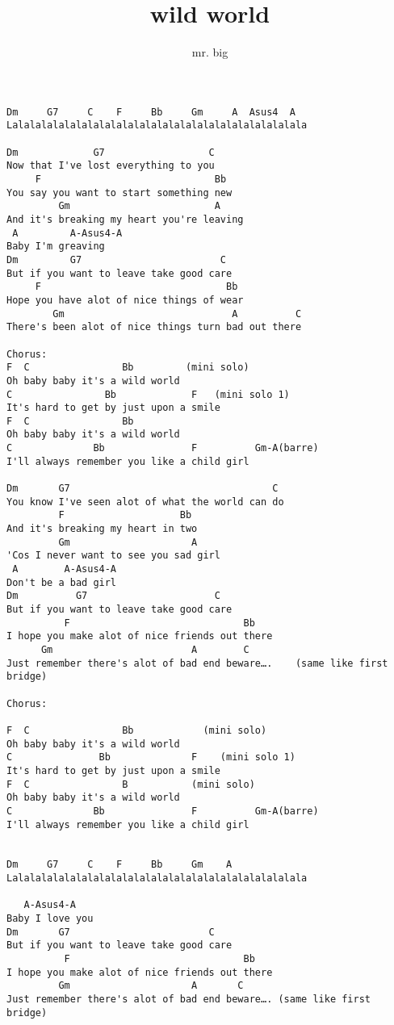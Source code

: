\author{mr. big}
\title{wild world}
\maketitle
\begin{verbatim}
Dm     G7     C    F     Bb     Gm     A  Asus4  A  
Lalalalalalalalalalalalalalalalalalalalalalalalalala

Dm             G7                  C
Now that I've lost everything to you
     F                              Bb
You say you want to start something new
         Gm                         A
And it's breaking my heart you're leaving
 A         A-Asus4-A
Baby I'm greaving
Dm         G7                        C
But if you want to leave take good care
     F                                Bb
Hope you have alot of nice things of wear
        Gm                             A          C
There's been alot of nice things turn bad out there

Chorus:
F  C                Bb         (mini solo)
Oh baby baby it's a wild world
C                Bb             F   (mini solo 1)
It's hard to get by just upon a smile
F  C                Bb
Oh baby baby it's a wild world
C              Bb               F          Gm-A(barre)
I'll always remember you like a child girl

Dm       G7                                   C
You know I've seen alot of what the world can do
         F                    Bb
And it's breaking my heart in two
         Gm                     A
'Cos I never want to see you sad girl
 A        A-Asus4-A
Don't be a bad girl
Dm          G7                      C
But if you want to leave take good care
          F                              Bb
I hope you make alot of nice friends out there
      Gm                        A        C
Just remember there's alot of bad end beware….    (same like first bridge)

Chorus:

F  C                Bb            (mini solo)
Oh baby baby it's a wild world
C               Bb              F    (mini solo 1)
It's hard to get by just upon a smile
F  C                B           (mini solo)
Oh baby baby it's a wild world
C              Bb               F          Gm-A(barre)
I'll always remember you like a child girl


Dm     G7     C    F     Bb     Gm    A 
Lalalalalalalalalalalalalalalalalalalalalalalalalala

   A-Asus4-A
Baby I love you
Dm       G7                        C
But if you want to leave take good care
          F                              Bb
I hope you make alot of nice friends out there
         Gm                     A       C
Just remember there's alot of bad end beware…. (same like first bridge)
\end{verbatim}